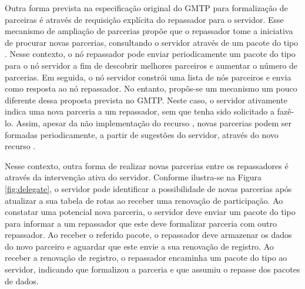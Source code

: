 %

Outra forma prevista na especificação original do GMTP para formalização de parceiras é através de requisição explícita do repassador para o servidor. Esse mecanismo de ampliação de parcerias propõe que o repassador tome a iniciativa de procurar novas parcerias, consultando o servidor através de um pacote do tipo .
Nesse contexto, o nó repassador pode enviar periodicamente um pacote do tipo  para o nó servidor a fim de descobrir melhores parceiros e aumentar o número de parcerias. Em seguida, o nó servidor constrói uma lista de nós parceiros e envia como resposta ao nó repassador. 
No entanto, propôs-se um mecanismo um pouco diferente dessa proposta prevista no GMTP. Neste caso, o servidor ativamente indica uma nova parceria a um repassador, sem que tenha sido solicitado a fazê-lo. 
Assim, apesar da não implementação do recurso , novas parcerias podem ser formadas periodicamente, a partir de sugestões do servidor, através do novo recurso .

Nesse contexto, outra forma de realizar novas parcerias entre os repassadores é através da intervenção ativa do servidor.
Conforme ilustra-se na Figura \ref{fig:delegate}, o servidor pode identificar a possibilidade de novas parcerias após atualizar a sua tabela de rotas ao receber uma renovação de participação. 
Ao constatar uma potencial nova parceria, o servidor deve enviar um pacote do tipo  para informar a um repassador que este deve formalizar parceria com outro repassador.
Ao receber o referido pacote, o repassador deve armazenar os dados do novo parceiro e aguardar que este envie a sua renovação de registro. Ao receber a renovação de registro, o repassador encaminha um pacote do tipo  ao servidor, indicando que formalizou a parceria e que assumiu o repasse dos pacotes de dados. 

